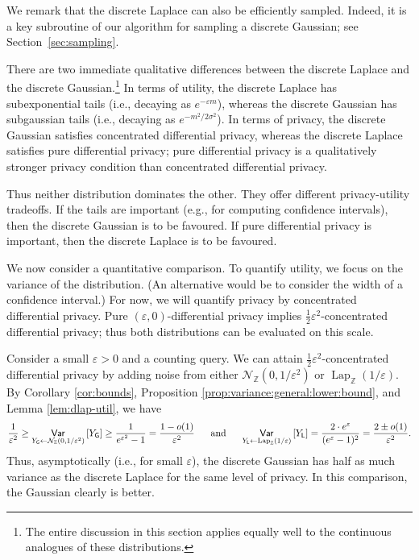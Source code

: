 \documentclass{jpc}
\newcommand{\discL}{\operatorname{Lap}_{\Z}} \newcommand{\discN}{\mathcal{N}_{\Z}}
\newcommand{\dgausss}[2]{{\discN\left(#1,#2\right)}}
\newcommand{\dgauss}[1]{\dgausss{0}{#1}}
\newcommand{\var}[2]{{\ifx&#1& \mathsf{Var} \else
\underset{#1}{\mathsf{Var}} \fi \left[#2\right]}}
\newcommand{\Z}{\mathbb{Z}}
\begin{document}
We remark that the discrete Laplace can also be efficiently sampled. Indeed, it is a key subroutine of our algorithm for sampling a discrete Gaussian; see Section~\ref{sec:sampling}.

There are two immediate qualitative differences between the discrete Laplace and the discrete Gaussian.\footnote{The entire discussion in this section applies equally well to the continuous analogues of these distributions.} In terms of utility, the discrete Laplace has subexponential tails (i.e., decaying as $e^{-\varepsilon m}$), whereas the discrete Gaussian has subgaussian tails (i.e., decaying as $e^{-m^2/2\sigma^2}$). In terms of privacy, the discrete Gaussian satisfies concentrated differential privacy, whereas the discrete Laplace satisfies pure differential privacy; pure differential privacy is a qualitatively stronger privacy condition than concentrated differential privacy.

Thus neither distribution dominates the other. They offer different privacy-utility tradeoffs. If the tails are important (e.g., for computing confidence intervals), then the discrete Gaussian is to be favoured. If pure differential privacy is important, then the discrete Laplace is to be favoured.

We now consider a quantitative comparison. To quantify utility, we focus on the variance of the distribution. (An alternative would be to consider the width of a confidence interval.) For now, we will quantify privacy by concentrated differential privacy. Pure $(\varepsilon,0)$-differential privacy implies $\frac12\varepsilon^2$-concentrated differential privacy; thus both distributions can be evaluated on this scale. 

Consider a small $\varepsilon>0$ and a counting query. We can attain $\frac12\varepsilon^2$-concentrated differential privacy by adding noise from either $\dgauss{1/\varepsilon^2}$ or $\discL(1/\varepsilon)$. By Corollary \ref{cor:bounds}, Proposition \ref{prop:variance:general:lower:bound}, and Lemma \ref{lem:dlap-util}, we have $$\frac{1}{\varepsilon^2} \ge \var{Y_\mathsf{G}\gets\dgauss{1/\varepsilon^2}}{Y_\mathsf{G}} \ge \frac{1}{e^{\varepsilon^2}-1} = \frac{1-o(1)}{\varepsilon^2} ~~~~\text{ and }~~~~ \var{Y_\mathsf{L}\gets\discL(1/\varepsilon)}{Y_\mathsf{L}} = \frac{2 \cdot e^\varepsilon}{(e^\varepsilon-1)^2}= \frac{2 \pm o(1)}{\varepsilon^2}.$$
Thus, asymptotically (i.e., for small $\varepsilon$), the discrete Gaussian has half as much variance as the discrete Laplace for the same level of privacy. In this comparison, the Gaussian clearly is better.
\end{document}
